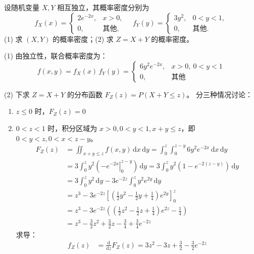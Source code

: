 \documentclass[lang=cn,11pt]{elegantbook}
\begin{document}
\begin{exercise}[卷积公式分段积分] \label{exer:3-8b}
设随机变量 $X, Y$ 相互独立，其概率密度分别为
\[
f_X(x) = \begin{cases} 2e^{-2x}, & x > 0, \\ 0, & \text{其他}, \end{cases} \quad f_Y(y) = \begin{cases} 3y^2, & 0 < y < 1, \\ 0, & \text{其他}. \end{cases}
\]
(1) 求 $(X,Y)$ 的概率密度；(2) 求 $Z = X + Y$ 的概率密度。
\end{exercise}

\begin{solution}
(1) 由独立性，联合概率密度为：
\[
f(x,y) = f_X(x)\,f_Y(y) = \begin{cases} 6y^2 e^{-2x}, & x > 0,\ 0 < y < 1 \\ 0, & \text{其他} \end{cases}
\]

(2) 下求 $Z=X+Y$ 的分布函数 $F_Z(z) = P(X+Y \leqslant z)$。
分三种情况讨论：
\begin{enumerate}
    \item $z \leqslant 0$ 时，$F_Z(z) = 0$
    \item $0 < z < 1$ 时，积分区域为 $x>0, 0<y<1, x+y \leqslant z$，即 $0 < y < z, 0 < x < z-y$。
\begin{align*}
    F_Z(z) &= \iint_{x+y\leqslant z} f(x,y) \,\mathrm{d}x\,\mathrm{d}y = \int_0^z \int_0^{z-y} 6y^2 e^{-2x} \,\mathrm{d}x\,\mathrm{d}y \\
    &= 3 \int_0^z y^2 \left( \left. -e^{-2x} \right|_0^{z-y} \right) \,\mathrm{d}y = 3 \int_0^z y^2 \left( 1 - e^{-2(z-y)} \right) \,\mathrm{d}y \\
    &= 3 \int_0^z y^2 \,\mathrm{d}y - 3e^{-2z} \int_0^z y^2 e^{2y} \,\mathrm{d}y \\
    &= z^3 - 3e^{-2z} \left[ \left( \frac{1}{2}y^2 - \frac{1}{2}y + \frac{1}{4} \right) e^{2y} \right]_0^z \\
    &= z^3 - 3e^{-2z} \left( \left( \frac{1}{2}z^2 - \frac{1}{2}z + \frac{1}{4} \right) e^{2z} - \frac{1}{4} \right) \\
    &= z^3 - \frac{3}{2}z^2 + \frac{3}{2}z - \frac{3}{4} + \frac{3}{4}e^{-2z}
\end{align*}
求导：
\begin{align*}
    f_Z(z) &= \frac{\mathrm{d}}{\mathrm{d}z} F_Z(z) = 3z^2 - 3z + \frac{3}{2} - \frac{3}{2}e^{-2z}
\end{align*}


\end{enumerate}
\end{solution}
\end{document}
